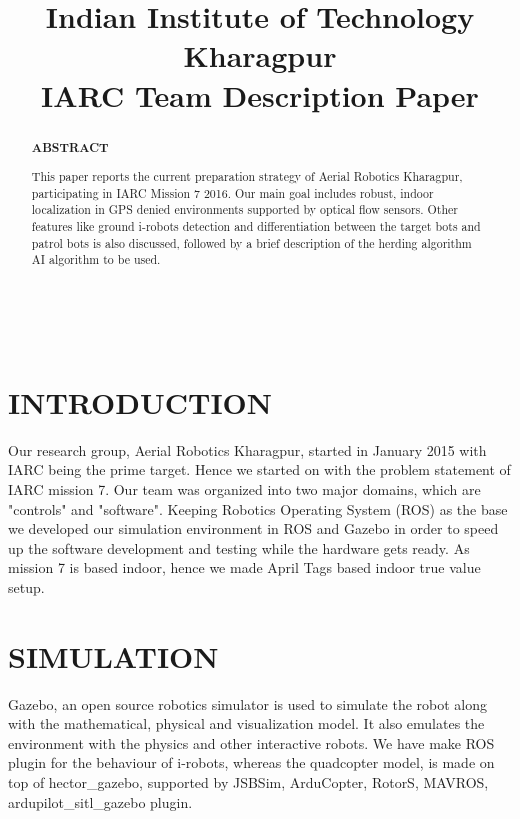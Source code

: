 \documentclass[12pt]{article}
\title{Indian Institute of Technology Kharagpur \\ 
IARC Team Description Paper}
\begin{document}
\maketitle
\\

\begin{abstract}

\begin{center}\textbf{ABSTRACT}\end{center}
This paper reports the current preparation strategy of Aerial Robotics Kharagpur,
participating in IARC Mission 7 2016. Our main goal includes robust, indoor 
localization in GPS denied environments supported by optical flow sensors. 
Other features like ground i-robots detection and differentiation between the 
target bots and patrol bots is also discussed, followed by a brief description 
of the herding algorithm AI algorithm to be used.
\end{abstract}


\section{INTRODUCTION}
Our research group, Aerial Robotics Kharagpur, started in January 2015 with IARC 
being the prime target. Hence we started on with the problem statement of IARC 
mission 7. Our team was organized into two major domains, which are "controls" 
and "software". Keeping Robotics Operating System (ROS) as the base we developed 
our simulation environment in ROS and Gazebo in order to speed up the software 
development and testing while the hardware gets ready. As mission 7 is based 
indoor, hence we made April Tags based indoor true value setup.

\section{SIMULATION}
Gazebo, an open source robotics simulator is used to simulate the robot along with 
the mathematical, physical and visualization model. It also emulates the environment 
with the physics and other interactive robots. We have make ROS plugin for the behaviour 
of i-robots, whereas the quadcopter model,
is made on top of hector\_gazebo, supported by JSBSim, ArduCopter, RotorS, MAVROS,
ardupilot\_sitl\_gazebo plugin.
\end{document}
